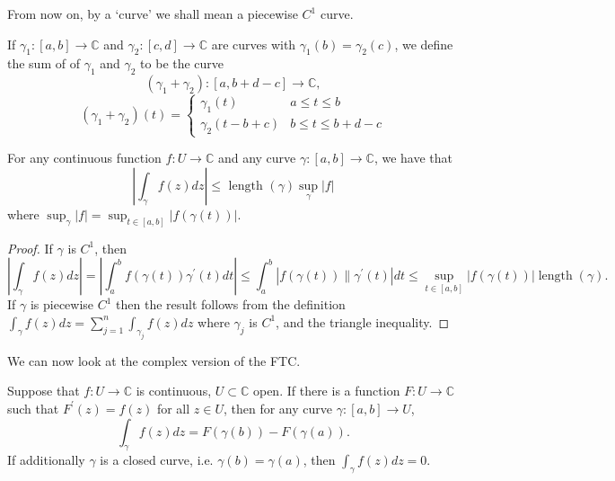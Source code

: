 \documentclass[a4paper]{scrartcl}
\begin{document}
\begin{remark}
      From now on, by a `curve' we shall mean a piecewise $C^{1}$ curve.
\end{remark}
\begin{definition*}
     If $\gamma_{1}:[a, b] \rightarrow \mathbb{C}$ and $\gamma_{2}:[c, d] \rightarrow \mathbb{C}$ are curves with $\gamma_{1}(b)=\gamma_{2}(c)$, we define the sum of of $\gamma_{1}$ and $\gamma_{2}$ to be the curve \[
          \left(\gamma_{1}+\gamma_{2}\right): [a, b+d-c] \rightarrow \mathbb{C}
     ,\] 
     \begin{equation*}
          \left(\gamma_{1}+\gamma_{2}\right)(t)=
           \begin{cases}
               \gamma_{1}(t) & a \leq t \leq b \\
               \gamma_{2}(t-b+c) & b \leq t \leq b+d-c
          \end{cases}
     \end{equation*}
\end{definition*}
\begin{proposition}
     For any continuous function $f: U \rightarrow \mathbb{C}$ and any curve $\gamma:[a, b] \rightarrow \mathbb{C}$, we have that
     $$
     \left|\int_{\gamma} f(z) d z\right| \leq \text { length }(\gamma) \sup _{\gamma}|f|
     $$
     where $\sup _{\gamma}|f|=\sup _{t \in[a, b]}|f(\gamma(t))|$.
\end{proposition}
\begin{proof}
     If $\gamma$ is $C^{1}$, then \[
          \left|\int_{\gamma} f(z) d z\right|=\left|\int_{a}^{b} f(\gamma(t)) \gamma^{\prime}(t) d t\right| \leq
          \int_{a}^{b}\left|f(\gamma(t)) \| \gamma^{\prime}(t)\right| d t \leq \sup _{t \in[a, b]}|f(\gamma(t))|\operatorname{length}(\gamma)
     .\] If $\gamma$ is piecewise $C^{1}$ then the result follows from the definition $\int_{\gamma} f(z) d z=\sum_{j=1}^{n} \int_{\gamma_{j}} f(z) d z$ where $\gamma_{j}$ is $C^{1}$, and the triangle inequality.
\end{proof}
We can now look at the complex version of the FTC.
\begin{theorem}
     Suppose that $f: U \rightarrow \mathbb{C}$ is continuous, $U \subset \mathbb{C}$ open. If there is a function $F: U \rightarrow \mathbb{C}$ such that $F^{\prime}(z)=f(z)$ for all $z \in U$, then for any curve $\gamma:[a, b] \rightarrow U$,
     $$
     \int_{\gamma} f(z) d z=F(\gamma(b))-F(\gamma(a)) .
     $$
     If additionally $\gamma$ is a closed curve, i.e. $\gamma(b)=\gamma(a)$, then $\int_{\gamma} f(z) d z=0$.
\end{theorem}
\end{document}
